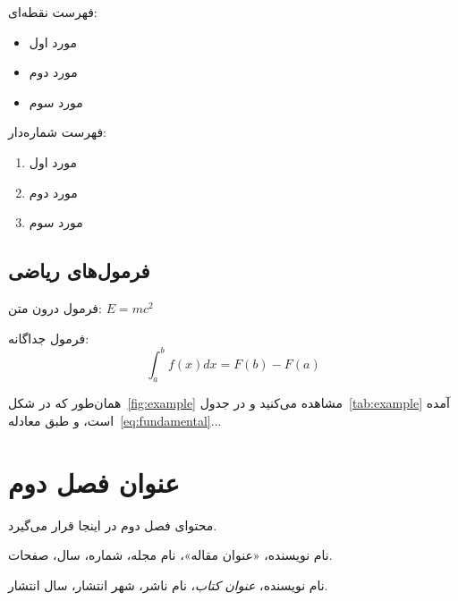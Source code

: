 \documentclass[12pt,a4paper,oneside]{book}
\begin{document}
فهرست نقطه‌ای:
\begin{itemize}
\item مورد اول
\item مورد دوم
\item مورد سوم
\end{itemize}

فهرست شماره‌دار:
\begin{enumerate}
\item مورد اول
\item مورد دوم
\item مورد سوم
\end{enumerate}

\section{فرمول‌های ریاضی}

فرمول درون متن: $E = mc^2$

فرمول جداگانه:
\begin{equation}
\int_{a}^{b} f(x) dx = F(b) - F(a)
\label{eq:fundamental}
\end{equation}

همان‌طور که در شکل~\ref{fig:example} مشاهده می‌کنید و در جدول~\ref{tab:example} آمده است، و طبق معادله~\ref{eq:fundamental}...

\chapter{عنوان فصل دوم}
\label{ch:chapter2}

محتوای فصل دوم در اینجا قرار می‌گیرد.


\backmatter

\begin{thebibliography}{99}

نام نویسنده، «عنوان مقاله»، نام مجله، شماره، سال، صفحات.

نام نویسنده، \textit{عنوان کتاب}، نام ناشر، شهر انتشار، سال انتشار.

\end{thebibliography}

\end{document}
